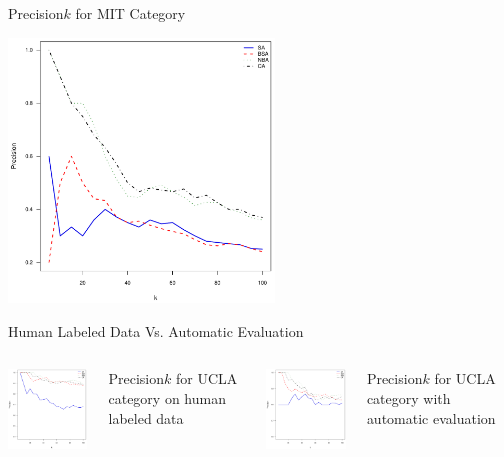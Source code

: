 \documentclass{beamer}
\begin{document}
\begin{frame}{Precision\at$k$ for MIT Category}
\begin{center}
  \includegraphics[width=200pt]{experiment/e1_mit.pdf}
\end{center}
\end{frame}

\begin{frame}{Human Labeled Data Vs. Automatic Evaluation}
\begin{columns}[c]
\column{2in}
  \includegraphics[width=2in]{experiment/e1_ucla_pool.pdf}
  \begin{center}Precision\at$k$ for UCLA category on human labeled data\end{center}
\column{2in}
  \includegraphics[width=2in]{experiment/e1_ucla.pdf}
  \begin{center}Precision\at$k$ for UCLA category with automatic evaluation\end{center}
\end{columns}
\end{frame}
\end{document}
